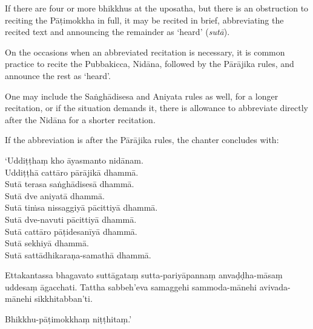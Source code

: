 If there are four or more bhikkhus at the uposatha, but there is an obstruction
to reciting the Pāṭimokkha in full, it may be recited in brief, abbreviating the
recited text and announcing the remainder as `heard' (\emph{sutā}).

On the occasions when an abbreviated recitation is necessary, it is common
practice to recite the Pubbakicca, Nidāna, followed by the Pārājika rules, and
announce the rest as `heard'.

One may include the Saṅghādisesa and Aniyata rules as well, for a longer
recitation, or if the situation demands it, there is allowance to abbreviate
directly after the Nidāna for a shorter recitation.

If the abbreviation is after the Pārājika rules, the chanter concludes with:

\vspace*{\parskip}

\begin{paritta}
`Uddiṭṭhaṃ kho āyasmanto nidānam.\\
Uddiṭṭhā cattāro pārājikā dhammā.\\
Sutā terasa saṅghādisesā dhammā.\\
Sutā dve aniyatā dhammā.\\
Sutā tiṁsa nissaggiyā pācittiyā dhammā.\\
Sutā dve-navuti pācittiyā dhammā.\\
Sutā cattāro pāṭidesanīyā dhammā.\\
Sutā sekhiyā dhammā.\\
Sutā sattādhikaraṇa-samathā dhammā.

Ettakantassa bhagavato suttāgataṃ sutta-pariyāpannaṃ anvaḍḍha-māsaṃ uddesaṃ āgacchati.
Tattha sabbeh'eva samaggehi sammoda-mānehi avivada-mānehi sikkhitabban'ti.

Bhikkhu-pāṭimokkhaṃ niṭṭhitaṃ.'
\end{paritta}


